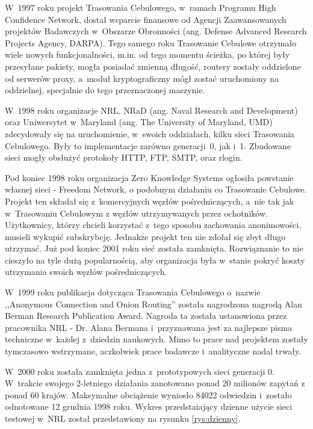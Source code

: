 W~1997 roku projekt Trasowania Cebulowego,  w~ramach Programu High Confidence Network, dostał wsparcie finansowe od Agencji Zaawansowanych projektów Badawczych w~Obszarze Obronności (ang. Defense Advanced Research Projects Agency, DARPA). Tego samego roku Trasowanie Cebulowe otrzymało wiele nowych funkcjonalności, m.in. od tego momentu ścieżka, po której były przesyłane pakiety, mogła posiadać zmienną długość, routery zostały oddzielone od serwerów proxy, a~moduł kryptograficzny mógł zostać uruchomiony na oddzielnej, specjalnie do tego przeznaczonej maszynie. 

W~1998 roku organizacje NRL,  NRaD (ang. Naval Research and Development) oraz Uniwersytet w~Maryland (ang. The University of Maryland, UMD) zdecydowały się na uruchomienie, w~swoich oddziałach, kilku sieci Trasowania Cebulowego. Były to implementacje zarówno generacji~0, jak i~1. Zbudowane sieci mogły obsłużyć protokoły HTTP, FTP, SMTP, oraz rlogin\cite{onion_router_history, cybercrime}. 

Pod koniec 1998 roku organizacja Zero Knowledge Systems ogłosiła powstanie własnej sieci - Freedom Network, o podobnym działaniu co Trasowanie Cebulowe. Projekt ten składał się z~komercyjnych węzłów pośredniczących, a~nie tak jak w~Trasowaniu Cebulowym z węzłów utrzymywanych przez ochotników. Użytkownicy, którzy chcieli korzystać z~tego sposobu zachowania anonimowości, musieli wykupić subskrybcję. Jednakże projekt ten nie zdołał się zbyt długo utrzymać. Już pod koniec 2001 roku sieć została zamknięta. Rozwiąznanie to nie cieszyło na tyle dużą popularnością, aby organizacja była w~stanie pokryć koszty utrzymania swoich węzłów pośredniczących.

W~1999 roku publikacja dotycząca Trasowania Cebulowego o~nazwie ,,Anonymous Connection and Onion Routing'' została nagrodzona nagrodą Alan Berman Research Publication Award. Nagroda ta została ustanowiona przez pracownika NRL - Dr. Alana Bermana i~przyznawana jest za najlepsze pisma techniczne w~każdej z~dziedzin naukowych\cite{berman_award}. Mimo to prace nad projektem zostały tymczasowo wstrzymane, aczkolwiek prace badawcze i~analityczne nadal trwały.

W~2000 roku została zamknięta jedna z~prototypowych sieci generacji 0. W~trakcie swojego 2-letniego działania zanotowano ponad 20 milionów zapytań z ponad 60 krajów. Maksymalne obciążenie wyniosło 84022 odwiedzin i~zostało odnotowane 12 grudnia 1998 roku. Wykres przedstaiający dzienne użycie sieci testowej w~NRL został przedstawiony na rysunku \ref{rys:dzienny}.

